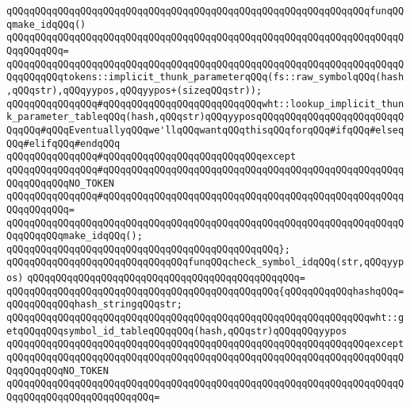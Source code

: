 \newline
\verb|qQQqqQQqqQQqqQQqqQQqqQQqqQQqqQQqqQQqqQQqqQQqqQQqqQQqqQQqqQQqqQQqfunqQQqmake_idqQQq()|\newline
\verb|qQQqqQQqqQQqqQQqqQQqqQQqqQQqqQQqqQQqqQQqqQQqqQQqqQQqqQQqqQQqqQQqqQQqqQQqqQQqqQQq=|\newline
\verb|qQQqqQQqqQQqqQQqqQQqqQQqqQQqqQQqqQQqqQQqqQQqqQQqqQQqqQQqqQQqqQQqqQQqqQQqqQQqqQQqtokens::implicit_thunk_parameterqQQq(fs::raw_symbolqQQq(hash,qQQqstr),qQQqyypos,qQQqyypos+(sizeqQQqstr));|\newline
\newline
\verb|qQQqqQQqqQQqqQQq#qQQqqQQqqQQqqQQqqQQqqQQqqQQqwht::lookup_implicit_thunk_parameter_tableqQQq(hash,qQQqstr)qQQqyyposqQQqqQQqqQQqqQQqqQQqqQQqqQQqqQQq#qQQqEventuallyqQQqwe'llqQQqwantqQQqthisqQQqforqQQq#ifqQQq#elseqQQq#elifqQQq#endqQQq|\newline
\verb|qQQqqQQqqQQqqQQq#qQQqqQQqqQQqqQQqqQQqqQQqqQQqexcept|\newline
\verb|qQQqqQQqqQQqqQQq#qQQqqQQqqQQqqQQqqQQqqQQqqQQqqQQqqQQqqQQqqQQqqQQqqQQqqQQqqQQqqQQqNO_TOKEN|\newline
\verb|qQQqqQQqqQQqqQQq#qQQqqQQqqQQqqQQqqQQqqQQqqQQqqQQqqQQqqQQqqQQqqQQqqQQqqQQqqQQqqQQq=|\newline
\verb|qQQqqQQqqQQqqQQqqQQqqQQqqQQqqQQqqQQqqQQqqQQqqQQqqQQqqQQqqQQqqQQqqQQqqQQqqQQqqQQqmake_idqQQq();|\newline
\verb|qQQqqQQqqQQqqQQqqQQqqQQqqQQqqQQqqQQqqQQqqQQqqQQq};|\newline
\newline
\verb|qQQqqQQqqQQqqQQqqQQqqQQqqQQqqQQqfunqQQqcheck_symbol_idqQQq(str,qQQqyypos)|\newline
\verb|qQQqqQQqqQQqqQQqqQQqqQQqqQQqqQQqqQQqqQQqqQQqqQQq=|\newline
\verb|qQQqqQQqqQQqqQQqqQQqqQQqqQQqqQQqqQQqqQQqqQQqqQQq{qQQqqQQqqQQqhashqQQq=qQQqqQQqqQQqhash_stringqQQqstr;|\newline
\newline
\verb|qQQqqQQqqQQqqQQqqQQqqQQqqQQqqQQqqQQqqQQqqQQqqQQqqQQqqQQqqQQqqQQqwht::getqQQqqQQqsymbol_id_tableqQQqqQQq(hash,qQQqstr)qQQqqQQqyypos|\newline
\verb|qQQqqQQqqQQqqQQqqQQqqQQqqQQqqQQqqQQqqQQqqQQqqQQqqQQqqQQqqQQqqQQqexcept|\newline
\verb|qQQqqQQqqQQqqQQqqQQqqQQqqQQqqQQqqQQqqQQqqQQqqQQqqQQqqQQqqQQqqQQqqQQqqQQqqQQqqQQqNO_TOKEN|\newline
\verb|qQQqqQQqqQQqqQQqqQQqqQQqqQQqqQQqqQQqqQQqqQQqqQQqqQQqqQQqqQQqqQQqqQQqqQQqqQQqqQQqqQQqqQQqqQQqqQQq=|\newline
